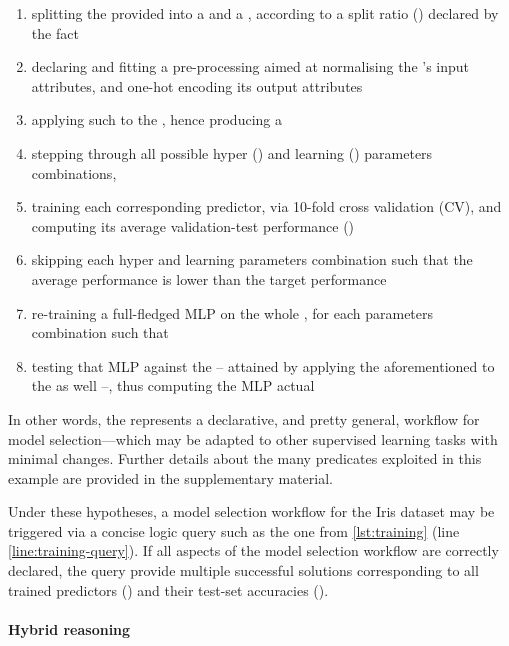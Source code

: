 \documentclass{article}
\begin{document}
\begin{enumerate}
    \item splitting the provided  into a  and a , according to a split ratio () declared by the  fact
    \item declaring and fitting a pre-processing  aimed at normalising the 's input attributes, and one-hot encoding its output attributes
    \item applying such  to the , hence producing a 
    \item stepping through all possible hyper () and learning () parameters combinations,
    \item training each corresponding predictor, via 10-fold cross validation (CV), and computing its average validation-test performance ()
    \item skipping each hyper and learning parameters combination such that the average performance  is lower than the target performance 
    \item re-training a full-fledged MLP on the whole , for each parameters combination such that 
    \item testing that MLP against the  -- attained by applying the aforementioned  to the  as well --, thus computing the MLP actual 
\end{enumerate}
%
In other words, the  represents a declarative, and pretty general, workflow for model selection---which may be adapted to other supervised learning tasks with minimal changes.
%
Further details about the many predicates exploited in this example are provided in the supplementary material.

Under these hypotheses, a model selection workflow for the Iris dataset may be triggered via a concise logic query such as the one from \cref{lst:training} (line \ref{line:training-query}).
%
If all aspects of the model selection workflow are correctly declared, the query provide multiple successful solutions corresponding to all trained predictors () and their test-set accuracies ().

\paragraph{Hybrid reasoning}
\end{document}
